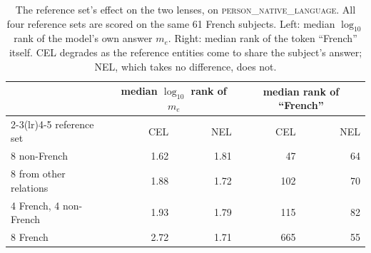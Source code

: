 \begin{table}[t]
\centering
\caption{The reference set's effect on the two lenses, on
\textsc{person\_native\_language}. All four reference sets are scored on
the same 61 French subjects. Left: median $\log_{10}$ rank of the
model's own answer $m_e$. Right: median rank of the token ``French''
itself. CEL degrades as the reference entities come to share the
subject's answer; NEL, which takes no difference, does not.}
\label{tab:refsets}

\begin{tabular}{@{}lrrrr@{}}
\toprule
& \multicolumn{2}{c}{median $\log_{10}$ rank of $m_e$}
& \multicolumn{2}{c}{median rank of ``French''} \\
\cmidrule(lr){2-3}\cmidrule(lr){4-5}
reference set & CEL & NEL & CEL & NEL \\
\midrule
8 non-French & 1.62 & 1.81 & 47 & 64 \\
8 from other relations & 1.88 & 1.72 & 102 & 70 \\
4 French, 4 non-French & 1.93 & 1.79 & 115 & 82 \\
8 French & 2.72 & 1.71 & 665 & 55 \\
\bottomrule
\end{tabular}
\end{table}
